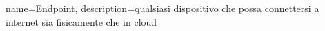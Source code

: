 {
	name={Endpoint},
	description={qualsiasi dispositivo che possa connettersi a internet sia fisicamente che in cloud}
}
